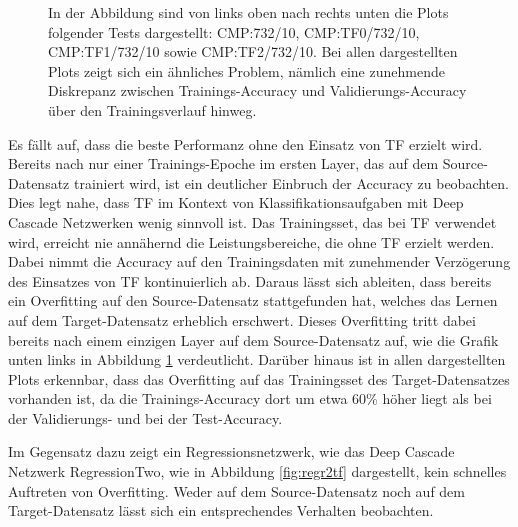 \begin{figure}[htpb]
    \caption{\label{fig:layertf} 
    \small{In der Abbildung sind von links oben nach rechts unten die Plots folgender Tests dargestellt: CMP:732/10, CMP:TF0/732/10, 
    CMP:TF1/732/10 sowie CMP:TF2/732/10. Bei allen dargestellten Plots zeigt sich ein ähnliches Problem, nämlich eine zunehmende Diskrepanz 
    zwischen Trainings-Accuracy und Validierungs-Accuracy über den Trainingsverlauf hinweg.}}
\end{figure}

Es fällt auf, dass die beste Performanz ohne den Einsatz von TF erzielt wird. Bereits nach nur einer Trainings-Epoche im 
ersten Layer, das auf dem Source-Datensatz trainiert wird, ist ein deutlicher Einbruch der Accuracy zu beobachten. Dies legt nahe, dass TF im 
Kontext von Klassifikationsaufgaben mit Deep Cascade Netzwerken wenig sinnvoll ist. Das Trainingsset, das bei TF verwendet wird, erreicht nie 
annähernd die Leistungsbereiche, die ohne TF erzielt werden. 
Dabei nimmt die Accuracy auf den Trainingsdaten mit zunehmender Verzögerung des Einsatzes von TF kontinuierlich ab. 
Daraus lässt sich ableiten, dass bereits ein Overfitting auf den Source-Datensatz 
stattgefunden hat, welches das Lernen auf dem Target-Datensatz erheblich erschwert. Dieses Overfitting tritt dabei bereits nach einem einzigen 
Layer auf dem Source-Datensatz auf, wie die Grafik unten links in Abbildung \ref{fig:layertf} verdeutlicht. Darüber hinaus ist in allen 
dargestellten Plots erkennbar, dass das Overfitting auf das Trainingsset des Target-Datensatzes vorhanden ist, da die Trainings-Accuracy dort 
um etwa 60\% höher liegt als bei der Validierungs- und bei der Test-Accuracy.

Im Gegensatz dazu zeigt ein Regressionsnetzwerk, wie das Deep Cascade Netzwerk RegressionTwo, wie in Abbildung \ref{fig:regr2tf} dargestellt, 
kein schnelles Auftreten von Overfitting. Weder auf dem Source-Datensatz noch auf dem Target-Datensatz lässt sich ein entsprechendes Verhalten 
beobachten.

